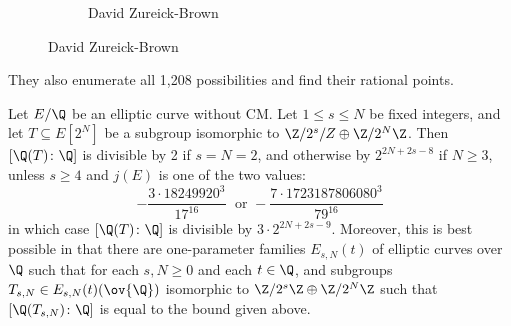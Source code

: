 \begin{frame}[plain]
\begin{figure}[h]
\begin{subfigure}{0.3\textwidth}
	\caption{David Zureick-Brown}
	\end{subfigure}
	\end{figure}
\begin{rem}
They also enumerate all 1,208 possibilities and find their rational points. 
\end{rem}
\end{frame}



\begin{frame}[plain]
\begin{thm}
Let $E/\Q$ be an elliptic curve without CM. Let $1 \leq s \leq N$ be fixed integers, and let $T \subseteq E[2^N]$ be a subgroup isomorphic to $\Z/2^s/Z \oplus \Z/2^N \Z$. Then $[\Q(T) \colon \Q]$ is divisible by 2 if $s=N=2$, and otherwise by $2^{2N+2s-8}$ if $N \geq 3$, unless $s \geq 4$ and $j(E)$ is one of the two values:
	\[
	- \dfrac{3 \cdot 18249920^3}{17^{16}}\; \text{ or } - \dfrac{7 \cdot 1723187806080^3}{79^{16}}
	\]
in which case $[\Q(T) \colon \Q]$ is divisible by $3 \cdot 2^{2N+2s-9}$. Moreover, this is best possible in that there are one-parameter families $E_{s,N}(t)$ of elliptic curves over $\Q$ such that for each $s, N \geq 0$ and each $t \in \Q$, and subgroups $T_{s,N} \in E_{s,N}(t)(\ov{\Q})$ isomorphic to $\Z/2^s\Z \oplus \Z/2^N\Z$ such that $[\Q(T_{s,N}) \colon \Q]$ is equal to the bound given above. 
\end{thm}
\end{frame}



